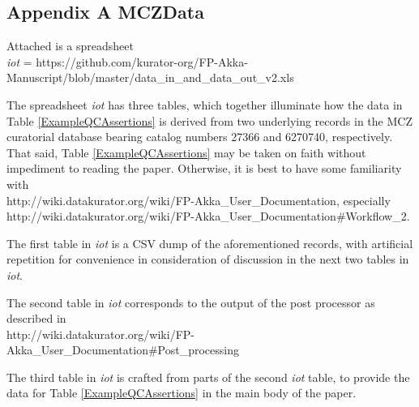 \begin{appendices}
\large
\section{Appendix A MCZData} \label{appendix1}
\normalsize
Attached is a spreadsheet
\\\textit{iot} = https://github.com/kurator-org/FP-Akka-Manuscript/blob/master/data\_in\_and\_data\_out\_v2.xls 


The spreadsheet \textit{iot} has three tables, which together illuminate how the data 
in Table \ref{ExampleQCAssertions} is derived from two underlying records in the MCZ curatorial database bearing catalog numbers 27366 and 6270740, respectively. That said, Table \ref{ExampleQCAssertions} may be taken on faith without impediment to reading the paper. Otherwise, it is best to have some familiarity with 
\\http://wiki.datakurator.org/wiki/FP-Akka\_User\_Documentation, especially 
\\http://wiki.datakurator.org/wiki/FP-Akka\_User\_Documentation\#Workflow\_2.

The first table in \textit{iot} is a CSV dump of the aforementioned records, with artificial repetition for convenience in consideration of discussion in the next two tables in \textit{iot}.

The second table in \textit{iot} corresponds to the output of the post processor as described in
\\http://wiki.datakurator.org/wiki/FP-Akka\_User\_Documentation\#Post\_processing

The third table in \textit{iot} is crafted from parts of the second  \textit{iot} table, 
to provide the data for Table \ref{ExampleQCAssertions} in the main body of the paper.



\end{appendices}
